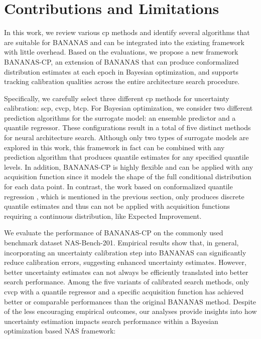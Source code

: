 \documentclass[a4paper,oneside,bibliography=totoc]{scrbook}
\begin{document}
\section{Contributions and Limitations}
In this work, we review various \gls{cp} methods and identify several algorithms that are suitable for BANANAS and can be integrated into the existing framework with little overhead. Based on the evaluations, we propose a new framework BANANAS-CP, an extension of BANANAS that can produce conformalized distribution estimates at each epoch in Bayesian optimization, and supports tracking calibration qualities across the entire architecture search procedure. 

Specifically, we carefully select three different \gls{cp} methods for uncertainty calibration: \gls{scp}, \gls{cvcp}, \gls{btcp}. For Bayesian optimization, we consider two different prediction algorithms for the surrogate model: an ensemble predictor and a quantile regressor. These configurations result in a total of five distinct methods for neural architecture search. Although only two types of surrogate models are explored in this work, this framework in fact can be combined with any prediction algorithm that produces quantile estimates for any specified quantile levels. In addition, BANANAS-CP is highly flexible and can be applied with any acquisition function since it models the shape of the full conditional distribution for each data point. In contrast, the work based on conformalized quantile regression \cite{salinas2023optimizing}, which is mentioned in the previous section, only produces discrete quantile estimates and thus can not be applied with acquisition functions requiring a continuous distribution, like Expected Improvement.

We evaluate the performance of BANANAS-CP on the commonly used benchmark dataset NAS-Bench-201. Empirical results show that, in general, incorporating an uncertainty calibration step into BANANAS can significantly reduce calibration errors, suggesting enhanced uncertainty estimates. However, better uncertainty estimates can not always be efficiently translated into better search performance. Among the five variants of calibrated search methods, only \gls{cvcp} with a quantile regressor and a specific acquisition function has achieved better or comparable performances than the original BANANAS method. Despite of the  less encouraging empirical outcomes, our analyses provide insights into how uncertainty estimation impacts search performance within a Bayesian optimization based NAS framework:
\end{document}
